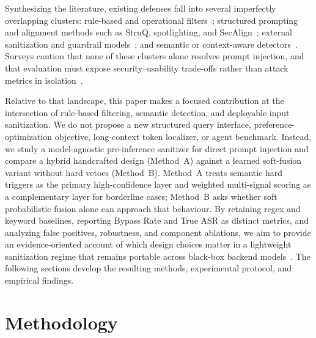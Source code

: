 ﻿\documentclass[10pt]{article}
\begin{document}
Synthesizing the literature, existing defenses fall into several imperfectly overlapping clusters: rule-based and operational filters~\cite{openrouter2026promptinjection,getstream2024prompt,mend2024prompt}; structured prompting and alignment methods such as StruQ, spotlighting, and SecAlign~\cite{struq2024,hines2024spotlighting,secalign2024}; external sanitization and guardrail models~\cite{geng2025pisanitizer,shi2025promptarmor,chowdhury2025prepsilonepsilonmptsanitizingsensitiveprompts}; and semantic or context-aware detectors~\cite{wang2025promptsleuth,kholkar2025capture}.
Surveys caution that none of these clusters alone resolves prompt injection, and that evaluation must expose security--usability trade-offs rather than attack metrics in isolation~\cite{correia2026systematic,bair2025prompt,11359704,zizzo2025adversarial}.

Relative to that landscape, this paper makes a focused contribution at the intersection of rule-based filtering, semantic detection, and deployable input sanitization.
We do not propose a new structured query interface, preference-optimization objective, long-context token localizer, or agent benchmark.
Instead, we study a model-agnostic pre-inference sanitizer for direct prompt injection and compare a hybrid handcrafted design (Method~A) against a learned soft-fusion variant without hard vetoes (Method~B).
Method~A treats semantic hard triggers as the primary high-confidence layer and weighted multi-signal scoring as a complementary layer for borderline cases; Method~B asks whether soft probabilistic fusion alone can approach that behaviour.
By retaining regex and keyword baselines, reporting Bypass Rate and True ASR as distinct metrics, and analyzing false positives, robustness, and component ablations, we aim to provide an evidence-oriented account of which design choices matter in a lightweight sanitization regime that remains portable across black-box backend models~\cite{zizzo2025adversarial,bair2025prompt,correia2026systematic}.
The following sections develop the resulting methods, experimental protocol, and empirical findings.



\section{Methodology}
\label{sec:methodology}
\end{document}
